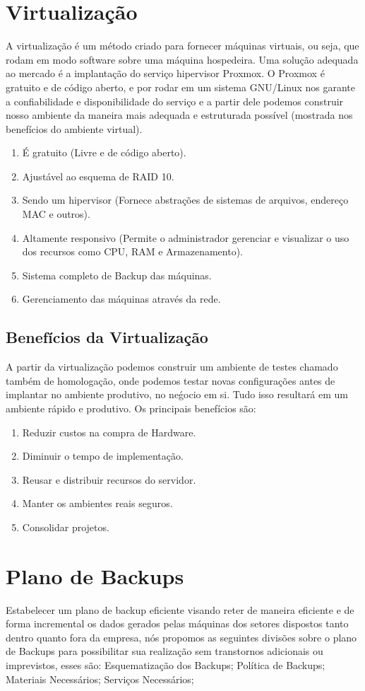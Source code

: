 \documentclass[12pt]{article}
\begin{document}
\section{Virtualização}
A virtualização é um método criado para fornecer máquinas virtuais, ou seja, que rodam em modo software sobre uma máquina hospedeira. Uma solução adequada ao mercado é a implantação do serviço hipervisor Proxmox. O Proxmox é gratuito e de código aberto, e por rodar em um sistema GNU/Linux nos garante a confiabilidade e disponibilidade do serviço e a partir dele podemos construir nosso ambiente da maneira mais adequada e estruturada possível (mostrada nos benefícios do ambiente virtual).
\begin{enumerate}
    \item É gratuito (Livre e de código aberto).
    \item Ajustável ao esquema de RAID 10.
    \item Sendo um hipervisor (Fornece abstrações de sistemas de arquivos, endereço MAC e outros).
    \item Altamente responsivo (Permite o administrador gerenciar e visualizar o uso dos recursos como CPU, RAM e Armazenamento).
    \item Sistema completo de Backup das máquinas.
    \item Gerenciamento das máquinas através da rede.
\end{enumerate}
\subsection{Benefícios da Virtualização}
A partir da virtualização podemos construir um ambiente de testes chamado também de homologação, onde podemos testar novas configurações antes de implantar no ambiente produtivo, no neǵocio em si. Tudo isso resultará em um ambiente rápido e produtivo. Os principais benefícios são:
\begin{enumerate}
    \item Reduzir custos na compra de Hardware.
    \item Diminuir o tempo de implementação.
    \item Reusar e distribuir recursos do servidor.
    \item Manter os ambientes reais seguros.
    \item Consolidar projetos.
\end{enumerate}
\section{Plano de Backups}
Estabelecer um plano de backup eficiente visando reter de maneira eficiente e de forma incremental os dados gerados pelas máquinas dos setores dispostos tanto dentro quanto fora da empresa, nós propomos as seguintes divisões sobre o plano de Backups para possibilitar sua realização sem transtornos adicionais ou imprevistos, esses são: Esquematização dos Backups; Política de Backups; Materiais Necessários; Serviços Necessários;
\end{document}
